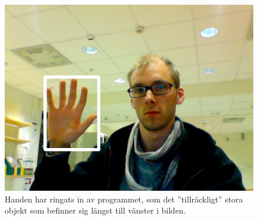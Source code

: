 \documentclass[../rapport_MVEX01-11-05]{subfiles}
\begin{document}
\begin{figure}
  \centering
  \includegraphics[width=0.9\columnwidth]{bilder/boundingbox}
  \caption{Handen har ringats in av programmet, som det
  ''tillräckligt'' stora objekt som befinner sig
  längst till vänster i bilden.}
  \label{fig:boundingbox}
\end{figure}
\end{document}
